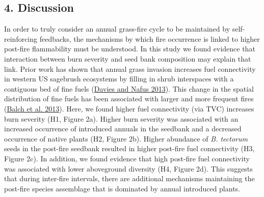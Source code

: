 \documentclass[
  12pt,
]{article}
\begin{document}
\hypertarget{discussion}{%
\subsection{4. Discussion}\label{discussion}}

In order to truly consider an annual grass-fire cycle to be maintained
by self-reinforcing feedbacks, the mechanisms by which fire occurrence
is linked to higher post-fire flammability must be understood. In this
study we found evidence that interaction between burn severity and seed
bank composition may explain that link. Prior work has shown that annual
grass invasion increases fuel connectivity in western US sagebrush
ecosystems by filling in shrub interspaces with a contiguous bed of fine
fuels (\protect\hyperlink{ref-Davies2013}{Davies and Nafus 2013}). This
change in the spatial distribution of fine fuels has been associated
with larger and more frequent fires
(\protect\hyperlink{ref-Balch2013}{Balch et al. 2013}). Here, we found
higher fuel connectivity (via TVC) increases burn severity (H1, Figure
2a). Higher burn severity was associated with an increased occurrence of
introduced annuals in the seedbank and a decreased occurrence of native
plants (H2, Figure 2b). Higher abundance of \emph{B. tectorum} seeds in
the post-fire seedbank resulted in higher post-fire fuel connectivity
(H3, Figure 2c). In addition, we found evidence that high post-fire fuel
connectivity was associated with lower aboveground diversity (H4, Figure
2d). This suggests that during inter-fire intervals, there are
additional mechanisms maintaining the post-fire species assemblage that
is dominated by annual introduced plants.
\end{document}
